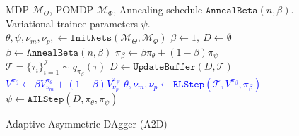 \begin{figure}[t]
\begin{minipage}{0.46\textwidth}
    \vspace{-0.25cm}
    \begin{algorithm}[H]
        \small %
        \caption{Adaptive Asymmetric DAgger (A2D)}
        \label{alg:a2d}
        \begin{algorithmic}[1]
           MDP $\mathcal{M}_{\Theta}$, POMDP $\mathcal{M}_{\Phi}$, Annealing schedule $\texttt{AnnealBeta}(n, \beta)$.
           Variational trainee parameters $\psi$.
          \STATE $\theta, \psi, \nu_m, \nu_p, \gets \texttt{InitNets} \left(\mathcal{M}_{\Theta}, \mathcal{M}_{\Phi} \right)$
          \STATE $\beta \gets 1,\ D \gets \emptyset$ 
            \STATE $\beta \gets \texttt{AnnealBeta}\left(n, \beta\right)$
            \STATE $\pi_{\beta} \gets \beta  \pi_{\theta}  + (1 - \beta) \pi_{\psi}$
            \STATE $\mathcal{T} = \{\tau_i\}_{i=1}^\mathcal{I} \sim q_{\pi_{\beta}} (\tau)$ \label{ln:alg:a2d:q}
            \STATE $D \gets \texttt{UpdateBuffer}\left(D, \mathcal{T} \right)$
            \STATE \textcolor{blue}{$V^{\pi_{\beta}} \gets \beta V^{\pi_{\theta}}_{\nu_m} + (1 - \beta) V^{\pi_{\psi}}_{\nu_p}$}  \label{ln:alg:a2d:rl_v}
            \STATE \textcolor{blue}{$\theta, \nu_m, \nu_p \gets \texttt{RLStep} \left( \mathcal{T}, V^{\pi_{\beta}}, \pi_{\beta} \right)$} \label{ln:alg:a2d:rl_p}
            \STATE $\psi \gets \texttt{AILStep}\left(D, \pi_{\theta}, \pi_{\psi} \right)$ \label{ln:alg:a2d:proj}
          \ENDFOR
        \end{algorithmic}
    \end{algorithm}
\end{minipage}
\vspace{-0.2cm}
\setcounter{algorithm}{0}
\end{figure}
